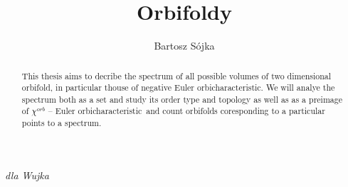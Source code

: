 \documentclass[a4paper, 12pt]{report}
\title{Orbifoldy}
\author{Bartosz Sójka}
\newcommand{\Eoc}{Euler orbicharacteristic}
\begin{document}

\newpage
\null
\thispagestyle{empty}

%
\newpage
\thispagestyle{empty}
\vspace*{19cm}
\hspace*{10cm}
\textit{dla Wujka}
\newpage
\null
\thispagestyle{empty}

\newpage
\tableofcontents
\begin{abstract}
\setcounter{page}{7}
This thesis aims to decribe the spectrum of all possible volumes of 
two dimensional orbifold, in particular thouse of negative \Eoc. 
We will analye the spectrum both as a set and study its order type and topology 
as well as as a preimage of $\chi^{orb}$ -- \Eoc\ and count orbifolds coresponding 
to a particular points to a spectrum. 
\end{abstract}

%
%






%
%

%
%

\appendix
%

%
\end{document}
